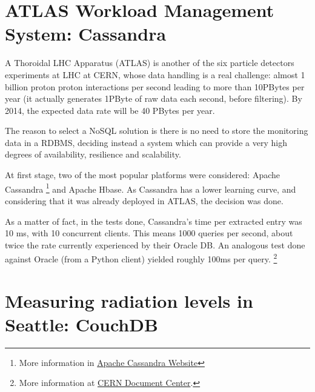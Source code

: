 \section{ATLAS Workload Management System: Cassandra}

A Thoroidal LHC Apparatus (ATLAS) is another of the six particle detectors experiments at LHC at CERN, whose data handling is a real challenge: almost 1 billion proton proton interactions per second leading to more than 10PBytes per year (it actually generates 1PByte of raw data each second, before filtering). By 2014, the expected data rate will be 40 PBytes per year.


The reason to select a NoSQL solution is there is no need to store the monitoring data in a RDBMS, deciding instead a system which can provide a very high degrees of availability, resilience and scalability.

At first stage, two of the most popular platforms were considered: Apache Cassandra \footnote{More information in \href{http://cassandra.apache.org/}{Apache Cassandra Website}} and Apache Hbase. As Cassandra has a lower learning curve, and considering that it was already deployed in ATLAS, the decision was done.

As a matter of fact, in the tests done, Cassandra's time per extracted entry was 10 ms, with 10 concurrent clients. This means 1000 queries per second, about twice the rate currently experienced by their Oracle DB. An analogous test done against Oracle (from a Python client) yielded roughly 100ms per query. \footnote{More information at \href{http://cds.cern.ch/record/1446655/files/ATL-SOFT-PROC-2012-012.pdf}{CERN Document Center}.}


\section{Measuring radiation levels in Seattle: CouchDB}

